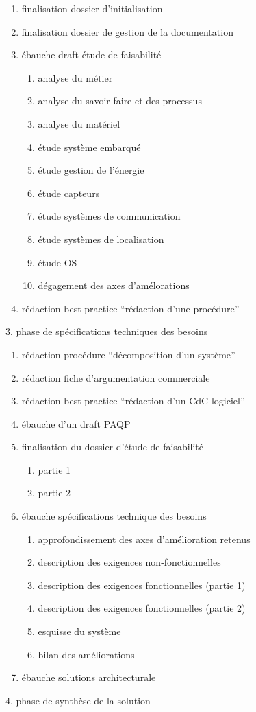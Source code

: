 \documentclass{mise_en_page}
\begin{document}
\begin{enumerate}
\item finalisation dossier d’initialisation
\item finalisation dossier de gestion de la documentation
\item ébauche draft étude de faisabilité

\begin{enumerate}
\item analyse du métier
\item analyse du savoir faire et des processus
\item analyse du matériel
\item étude système embarqué
\item étude gestion de l’énergie
\item étude capteurs
\item étude systèmes de communication
\item étude systèmes de localisation
\item étude OS
\item dégagement des axes d’amélorations
\end{enumerate}
\item rédaction best-practice “rédaction d’une procédure”
\end{enumerate}
3. phase de spécifications techniques des besoins

\begin{enumerate}
\item rédaction procédure “décomposition d’un système”
\item rédaction fiche d’argumentation commerciale
\item rédaction best-practice “rédaction d’un CdC logiciel”
\item ébauche d’un draft PAQP
\item finalisation du dossier d’étude de faisabilité

\begin{enumerate}
\item partie 1
\item partie 2
\end{enumerate}
\item ébauche spécifications technique des besoins

\begin{enumerate}
\item approfondissement des axes d’amélioration retenus
\item description des exigences non-fonctionnelles
\item description des exigences fonctionnelles (partie 1)
\item description des exigences fonctionnelles (partie 2)
\item esquisse du système
\item bilan des améliorations
\end{enumerate}
\item ébauche solutions architecturale
\end{enumerate}
4. phase de synthèse de la solution
\end{document}
